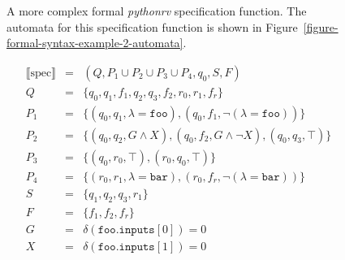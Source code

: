\begin{figure}[h!]
	\begin{center}
	\begin{minipage}{0.9\textwidth}
	
	\end{minipage}
	\end{center}

  \caption{A more complex formal \textit{pythonrv} specification function. The automata for
    this specification function is shown in
    Figure~\ref{figure-formal-syntax-example-2-automata}.}
	\label{figure-formal-syntax-example-2}
\end{figure}

\begin{figure}[h!]
	\begin{minipage}{0.9\textwidth}
		\centering
    \[
      \begin{array}{rcl}
        \llbracket \text{spec} \rrbracket & = & (Q, P_1 \cup P_2 \cup P_3 \cup P_4, q_0, S, F) \\
                     Q & = & \{q_0, q_1, f_1, q_2, q_3, f_2, r_0, r_1, f_r\} \\
                   P_1 & = & \{(q_0, q_1, \lambda = \texttt{foo}), (q_0, f_1, \neg(\lambda = \texttt{foo}))\} \\
                   P_2 & = & \{(q_0, q_2, G \wedge X), (q_0, f_2, G \wedge \neg X), (q_0, q_3, \top)\} \\
                   P_3 & = & \{(q_0, r_0, \top), (r_0, q_0, \top)\} \\
                   P_4 & = & \{(r_0, r_1, \lambda = \texttt{bar}), (r_0, f_r, \neg(\lambda = \texttt{bar}))\} \\
                     S & = & \{q_1, q_2, q_3, r_1\} \\
                     F & = & \{f_1, f_2, f_r\} \\
                     G & = & \delta(\texttt{foo.inputs$[0]$}) = 0 \\
                     X & = & \delta(\texttt{foo.inputs$[1]$}) = 0
      \end{array}
    \]
	\end{minipage}

  \bigskip

	\begin{minipage}{0.9\textwidth}
		\centering
		\begin{tikzpicture}[->,shorten >=1pt,node distance=3.5cm,on
      grid,auto,scale=.5,semithick,>=stealth]


\end{tikzpicture}
\end{minipage}
\end{figure}
